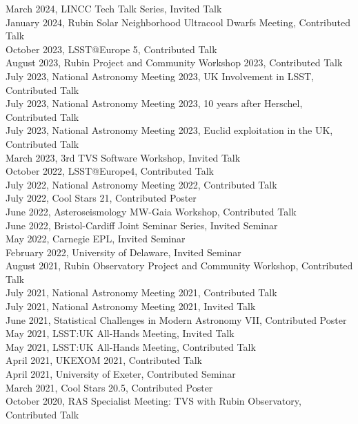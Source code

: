 \documentclass[letter, margin, 10pt]{res} %
\begin{document}
\begin{resume}
\vspace{-4pt}
March 2024, LINCC Tech Talk Series, Invited Talk\\
January 2024, Rubin Solar Neighborhood Ultracool Dwarfs Meeting, Contributed Talk\\
October 2023, LSST@Europe 5, Contributed Talk\\
August 2023, Rubin Project and Community Workshop 2023, Contributed Talk\\
July 2023, National Astronomy Meeting 2023, UK Involvement in LSST, Contributed Talk\\
July 2023, National Astronomy Meeting 2023, 10 years after Herschel, Contributed Talk\\
July 2023, National Astronomy Meeting 2023, Euclid exploitation in the UK, Contributed Talk\\
March 2023, 3rd TVS Software Workshop, Invited Talk\\
October 2022, LSST@Europe4, Contributed Talk\\
July 2022, National Astronomy Meeting 2022, Contributed Talk\\
July 2022, Cool Stars 21, Contributed Poster\\
June 2022, Asteroseismology MW-Gaia Workshop, Contributed Talk\\
June 2022, Bristol-Cardiff Joint Seminar Series, Invited Seminar\\
May 2022, Carnegie EPL, Invited Seminar\\
February 2022, University of Delaware, Invited Seminar\\
August 2021, Rubin Observatory Project and Community Workshop, Contributed Talk\\
July 2021, National Astronomy Meeting 2021, Contributed Talk\\
July 2021, National Astronomy Meeting 2021, Invited Talk\\
June 2021, Statistical Challenges in Modern Astronomy VII, Contributed Poster\\
May 2021, LSST:UK All-Hands Meeting, Invited Talk\\
May 2021, LSST:UK All-Hands Meeting, Contributed Talk\\
April 2021, UKEXOM 2021, Contributed Talk\\
April 2021, University of Exeter, Contributed Seminar\\
March 2021, Cool Stars 20.5, Contributed Poster\\
October 2020, RAS Specialist Meeting: TVS with Rubin Observatory, Contributed Talk\\

\end{resume}
\end{document}
